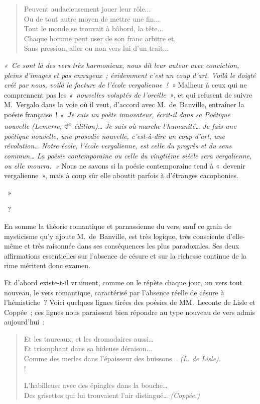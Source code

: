 \documentclass[french,twoside]{book} %
\begin{document}
{{\begin{verse}
Peuvent audacieusement jouer leur rôle...\\
Ou de tout autre moyen de mettre une fin...\\
Tout le monde se trouvait à bâbord, la tête...\\
Chaque homme peut user de son franc arbitre et,\\
Sans pression, aller ou non vers lui d’un trait...\\
\end{verse}
\par
\noindent \emph{« Ce sont là des vers très harmonieux, nous dit leur auteur avec conviction, pleins d’images et pas ennuyeux ; évidemment c’est un \emph{coup d’art}. Voilà le doigté créé par nous, voilà la facture de l’école \emph{vergalienne} ! »} Malheur à ceux qui ne comprennent pas les \emph{« nouvelles voluptés de l’oreille »}, et qui refusent de suivre M. Vergalo dans la voie où il veut, d’accord avec M. de Banville, entraîner la poésie française ! \emph{« Je suis un poète \emph{innovateur}, écrit-il dans sa \emph{Poétique nouvelle} (Lemerre, 2\textsuperscript{e} édition)… Je sais où marche l’humanité… Je fais une poétique nouvelle, une prosodie nouvelle, c’est-à-dire un coup d’art, une révolution… Notre école, l’école \emph{vergalienne}, est celle du progrès et du sens commun… La poésie contemporaine ou celle du vingtième siècle sera vergalienne, ou elle mourra. »} Nous ne savons si la poésie contemporaine tend à « devenir vergalienne », mais à coup sûr elle aboutit parfois à d’étranges cacophonies.
} »} ?\par
En somme la théorie romantique et parnassienne du vers, sauf ce grain de mysticisme qu’y ajoute M. de Banville, est très logique, très consciente d’elle-même et très raisonnée dans ses conséquences les plus paradoxales. Ses deux affirmations essentielles sur l’absence de césure et sur la richesse continue de la rime méritent donc examen.\par
Et d’abord existe-t-il vraiment, comme on le répète chaque jour, un vers tout nouveau, le vers romantique, caractérisé par l’absence réelle de césure à l’hémistiche ? Voici quelques lignes tirées des poésies de MM. Leconte de Lisle et Coppée ; ces lignes nous paraissent bien répondre au type nouveau de vers admis aujourd’hui :\par


\begin{verse}
Et les taureaux, et les dromadaires aussi…\\
Et triomphant dans sa hideuse déraison...\\
Comme des merles dans l’épaisseur des buissons... \emph{(L. de Lisle).}\\!

L’habilleuse avec des épingles dans la bouche…\\
Des grisettes qui lui trouvaient l’air distingué… \emph{(Coppée.)}\\
\end{verse}
\end{document}
